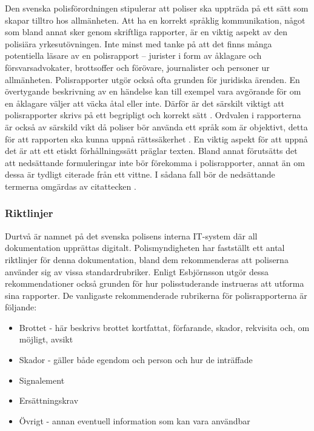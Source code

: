 \documentclass[swedish]{maucsthesis}
\begin{document}
Den svenska polisförordningen stipulerar att poliser ska uppträda på ett sätt
som skapar tilltro hos allmänheten. Att ha en korrekt språklig kommunikation,
något som bland annat sker genom skriftliga rapporter, är en viktig aspekt av
den polisiära yrkesutövningen. Inte minst med tanke på att det finns många
potentiella läsare av en polisrapport – jurister i form av åklagare och
försvarsadvokater, brottsoffer och förövare, journalister och personer ur
allmänheten. Polisrapporter utgör också ofta grunden för juridiska ärenden. En
övertygande beskrivning av en händelse kan till exempel vara avgörande för om en
åklagare väljer att väcka åtal eller inte. Därför är det särskilt viktigt att
polisrapporter skrivs på ett begripligt och korrekt sätt \cite{ask:2013}.
Ordvalen i rapporterna är också av särskild vikt då poliser bör använda ett
språk som är objektivt, detta för att rapporten ska kunna uppnå rättssäkerhet
\cite{ask:2018}. En viktig aspekt för att uppnå det är att ett etiskt
förhållningssätt präglar texten. Bland annat förutsätts det att nedsättande
formuleringar inte bör förekomma i polisrapporter, annat än om dessa är tydligt
citerade från ett vittne. I sådana fall bör de nedsättande termerna omgärdas av
citattecken \cite{ask:2013}.
\subsubsection{Riktlinjer}
Durtvå är namnet på det svenska polisens interna IT-system där all dokumentation
upprättas digitalt. Polismyndigheten har fastställt ett antal riktlinjer för
denna dokumentation, bland dem rekommenderas att poliserna använder sig av vissa
standardrubriker. Enligt Esbjörnsson utgör dessa rekommendationer också
grunden för hur polisstuderande instrueras att utforma sina rapporter. De
vanligaste rekommenderade rubrikerna för polisrapporterna är följande:

\begin{itemize}
\item Brottet - här beskrivs brottet kortfattat, förfarande, skador, rekvisita
  och, om möjligt, avsikt
\item Skador - gäller både egendom och person och hur de inträffade
\item Signalement
\item Ersättningskrav
\item Övrigt - annan eventuell information som kan vara användbar
\end{itemize}
\end{document}
